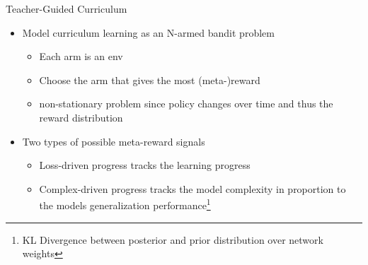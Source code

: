 \begin{frame}[c]{Teacher-Guided Curriculum }
	
	\begin{itemize}
		\item Model curriculum learning as an N-armed bandit problem
		\begin{itemize}
			\item Each arm is an env 
			\item Choose the arm that gives the most (meta-)reward
			\item non-stationary problem since policy changes over time and thus the reward distribution
		\end{itemize}
		\smallskip
		\pause
		\item Two types of possible meta-reward signals
		\begin{itemize}
			\item Loss-driven progress tracks the learning progress
			\item Complex-driven progress tracks the model complexity in proportion to the models generalization performance\footnote{KL Divergence between posterior and prior distribution over network weights}
		\end{itemize}
	\end{itemize}
	
\end{frame}
